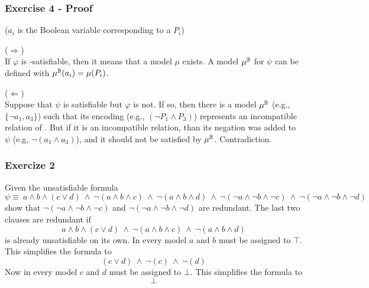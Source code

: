 \begin{frame}
  \frametitle{Exercise 4 - Proof}

  ($a_i$ is the Boolean variable corresponding to a \tatom $P_i$)
  \vfill

  ($\Rightarrow$)
  \medskip \\
  If $\varphi$ is \T-satisfiable, then it means that a model $\mu$ exists.
  A model $\mu^\mathbb{B}$ for $\psi$ can be defined with $\mu^\mathbb{B}(a_i) = \mu(P_i)$.
  \vfill\pause
  
  ($\Leftarrow$)
  \medskip \\
  Suppose that $\psi$ is satisfiable but $\varphi$ is not. If so, then
  there is a model $\mu^\mathbb{B}$ (e.g., $\{ \neg a_1, a_3 \}$) such that 
  its encoding (e.g., $(\neg P_1 \wedge P_3)$) represents an incompatible relation
  of \tatoms. But if it is an incompatible relation, than its negation was
  added to $\psi$ (e.g, $\neg ( a_1 \wedge a_3 )$), and it should not be satisfied
  by $\mu^\mathbb{B}$. Contradiction.
  
\end{frame}

\begin{frame}
  \frametitle{Exercize 2}

  \scriptsize

  Given the unsatisfiable formula 
  $$
  \psi \equiv\ a \wedge b \wedge (c \vee d)\ \wedge\ \neg( a \wedge b \wedge c )\ \wedge\ \neg( a \wedge b \wedge d )\ \wedge\
  \neg( \neg a \wedge \neg b \wedge \neg c )\ \wedge\ \neg( \neg a \wedge \neg b \wedge \neg d )
  $$
  show that $\neg( \neg a \wedge \neg b \wedge \neg c )$ and $\neg( \neg a \wedge \neg b \wedge \neg d )$ are redundant.
  \vfill\pause
  The last two clauses are redundant if 
  $$a \wedge b \wedge (c \vee d)\ \wedge\ \neg( a \wedge b \wedge c )\ \wedge\ \neg( a \wedge b \wedge d )$$
  is already unsatisfiable on its own. \pause In every model $a$ and $b$ must be assigned to $\top$. This simplifies
  the formula to
  $$(c \vee d)\ \wedge\ \neg( c )\ \wedge\ \neg( d )$$\pause
  Now in every model $c$ and $d$ must be assigned to $\bot$. This simplifies the formula to
  $$\bot$$

\end{frame}
